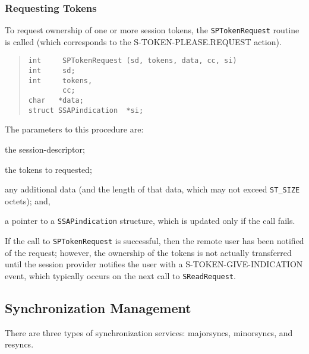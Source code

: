 \subsubsection	{Requesting Tokens}
To request ownership of one or more session tokens,
the \verb"SPTokenRequest" routine is called
(which corresponds to the {\sf S-TOKEN-PLEASE.REQUEST\/} action).
\begin{quote}\small\begin{verbatim}
int     SPTokenRequest (sd, tokens, data, cc, si)
int     sd;
int     tokens,
        cc;
char   *data;
struct SSAPindication  *si;
\end{verbatim}\end{quote}
The parameters to this procedure are:
\begin{describe}
\item[\verb"sd":] the session-descriptor;

\item[\verb"tokens":] the tokens to requested;

\item[\verb"data"/\verb"cc":] any additional data
(and the length of that data, which may not exceed \verb"ST_SIZE" octets);
and,

\item[\verb"si":] a pointer to a \verb"SSAPindication" structure, which is
updated only if the call fails.
\end{describe}
If the call to \verb"SPTokenRequest" is successful,
then the remote user has been notified of the request;
however, the ownership of the tokens is not actually transferred until the
session provider notifies the user with a {\sf S-TOKEN-GIVE-INDICATION\/}
event,
which typically occurs on the next call to \verb"SReadRequest".

\subsection	{Synchronization Management}\label{sync:mgmt}
There are three types of synchronization services:
majorsyncs, minorsyncs, and resyncs.

